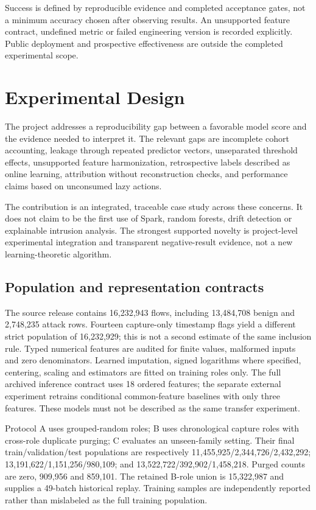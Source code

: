 \documentclass[conference]{IEEEtran}
\begin{document}
Success is defined by reproducible evidence and completed acceptance gates, not a minimum accuracy chosen after observing results. An unsupported feature contract, undefined metric or failed engineering version is recorded explicitly. Public deployment and prospective effectiveness are outside the completed experimental scope.

\section{Experimental Design}
The project addresses a reproducibility gap between a favorable model score and the evidence needed to interpret it. The relevant gaps are incomplete cohort accounting, leakage through repeated predictor vectors, unseparated threshold effects, unsupported feature harmonization, retrospective labels described as online learning, attribution without reconstruction checks, and performance claims based on unconsumed lazy actions.

The contribution is an integrated, traceable case study across these concerns. It does not claim to be the first use of Spark, random forests, drift detection or explainable intrusion analysis. The strongest supported novelty is project-level experimental integration and transparent negative-result evidence, not a new learning-theoretic algorithm.

\subsection{Population and representation contracts}
The source release contains 16,232,943 flows, including 13,484,708 benign and 2,748,235 attack rows. Fourteen capture-only timestamp flags yield a different strict population of 16,232,929; this is not a second estimate of the same inclusion rule. Typed numerical features are audited for finite values, malformed inputs and zero denominators. Learned imputation, signed logarithms where specified, centering, scaling and estimators are fitted on training roles only. The full archived inference contract uses 18 ordered features; the separate external experiment retrains conditional common-feature baselines with only three features. These models must not be described as the same transfer experiment.

Protocol A uses grouped-random roles; B uses chronological capture roles with cross-role duplicate purging; C evaluates an unseen-family setting. Their final train/validation/test populations are respectively 11,455,925/2,344,726/2,432,292; 13,191,622/1,151,256/980,109; and 13,522,722/392,902/1,458,218. Purged counts are zero, 909,956 and 859,101. The retained B-role union is 15,322,987 and supplies a 49-batch historical replay. Training samples are independently reported rather than mislabeled as the full training population.
\end{document}
